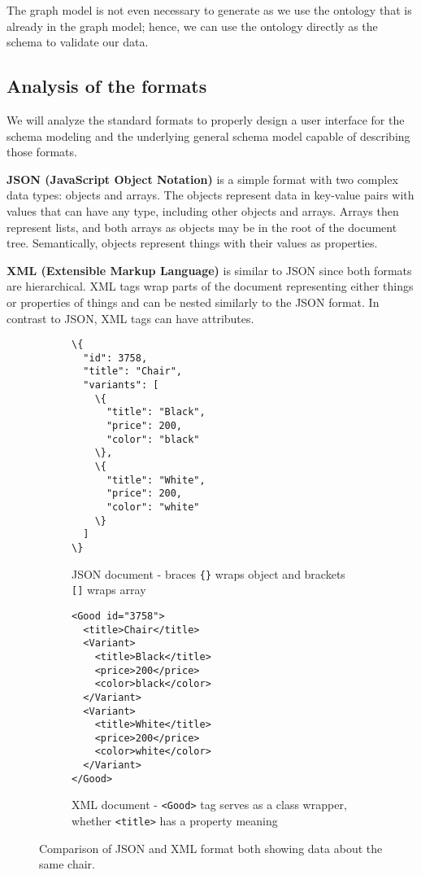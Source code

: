 The graph model is not even necessary to generate as we use the ontology that is already in the graph model; hence, we can use the ontology directly as the schema to validate our data.


\subsection{Analysis of the formats}

We will analyze the standard formats to properly design a user interface for the schema modeling and the underlying general schema model capable of describing those formats.

\smallskip

\textbf{JSON (JavaScript Object Notation)} is a simple format with two complex data types: objects and arrays. The objects represent data in key-value pairs with values that can have any type, including other objects and arrays. Arrays then represent lists, and both arrays as objects may be in the root of the document tree. Semantically, objects represent things with their values as properties.

\textbf{XML (Extensible Markup Language)} is similar to JSON since both formats are hierarchical. XML tags wrap parts of the document representing either things or properties of things and can be nested similarly to the JSON format. In contrast to JSON, XML tags can have attributes.

\begin{figure}[h!]\centering
    \begin{subfigure}[b]{.45\textwidth}
\begin{Verbatim}[commandchars=\\\{\}]
\{
  "id": 3758,
  "title": "Chair",
  "variants": [
    \{
      "title": "Black",
      "price": 200,
      "color": "black"
    \},
    \{
      "title": "White",
      "price": 200,
      "color": "white"
    \}
  ]
\}
\end{Verbatim}
        \caption{JSON document - braces {\tt\{\}} wraps object and brackets {\tt[]} wraps array}
      \end{subfigure}\hfil%
      \begin{subfigure}[b]{.45\textwidth}
\begin{Verbatim}[commandchars=\\\{\}]
<Good id="3758">
  <title>Chair</title>
  <Variant>
    <title>Black</title>
    <price>200</price>
    <color>black</color>
  </Variant>
  <Variant>
    <title>White</title>
    <price>200</price>
    <color>white</color>
  </Variant>
</Good>
\end{Verbatim}

\vfill

        \caption{XML document - {\tt<Good>} tag serves as a class wrapper, whether {\tt<title>} has a property meaning}
      \end{subfigure}
    \caption{Comparison of JSON and XML format both showing data about the same chair.}
    \label{analysis/xml-json}
\end{figure}

